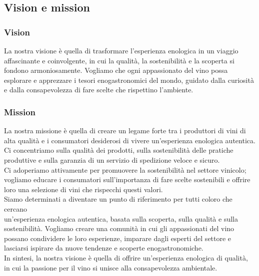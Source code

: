 \documentclass[12pt, a4paper]{article}
\newcommand{\meskip}{\medskip \\}
\begin{document}
\subsection{Vision e mission}
\subsubsection*{Vision}
La nostra visione è quella di trasformare l'esperienza enologica in un viaggio affascinante e coinvolgente, in cui la qualità, la sostenibilità e la scoperta si fondono armoniosamente.
Vogliamo che ogni appassionato del vino possa esplorare e apprezzare i tesori enogastronomici del mondo, guidato dalla curiosità e dalla consapevolezza di fare scelte che rispettino l'ambiente.

\subsubsection*{Mission}
La nostra missione è quella di creare un legame forte tra i produttori di vini di alta qualità e i consumatori desiderosi di vivere un'esperienza enologica autentica.\\
Ci concentriamo sulla qualità dei prodotti, sulla sostenibilità delle pratiche produttive e sulla garanzia di un servizio di spedizione veloce e sicuro.\meskip
Ci adoperiamo attivamente per promuovere la sostenibilità nel settore vinicolo; vogliamo educare i consumatori sull'importanza di fare scelte sostenibili e offrire loro una selezione di vini che rispecchi questi valori.\meskip
Siamo determinati a diventare un punto di riferimento per tutti coloro che cercano\\ un'esperienza enologica autentica, basata sulla scoperta, sulla qualità e sulla sostenibilità.
Vogliamo creare una comunità in cui gli appassionati del vino possano condividere le loro esperienze, imparare dagli esperti del settore e lasciarsi ispirare da nuove tendenze e scoperte enogastronomiche.\meskip
In sintesi, la nostra visione è quella di offrire un'esperienza enologica di qualità, in cui la passione per il vino si unisce alla consapevolezza ambientale.
\end{document}
